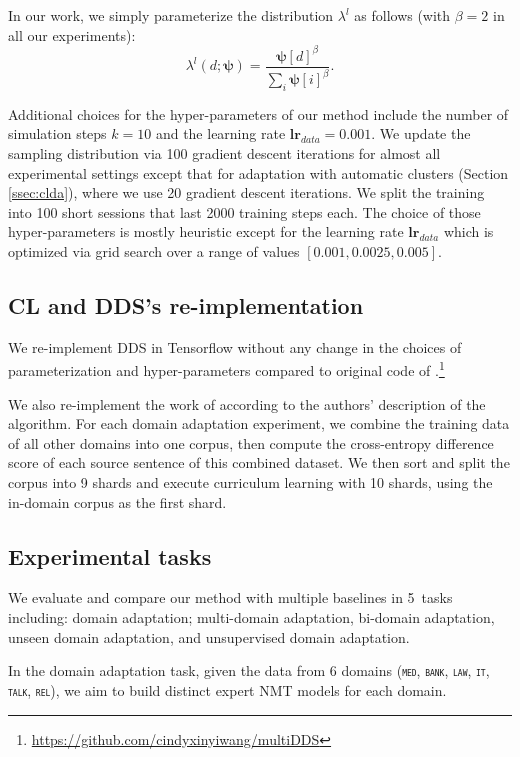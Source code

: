\documentclass[11pt]{article}
\newcommand{\fyTodo}[1]{\Todo[FY:]{\textcolor{orange}{#1}}}
\newcommand{\domain}[1]{\texttt{\textsc{#1}}}
\newcommand{\vpsi}{\ensuremath{\boldsymbol\psi}\xspace} %
\begin{document}
In our work, we simply parameterize the distribution $\lambda^l$ as follows (with $\beta=2$ in all our experiments):\fyTodo{Explain why}
\begin{equation}
\lambda
^l(d;\vpsi) = \frac{\vpsi[d]^\beta}{\sum_i \vpsi[i]^\beta}. \nonumber
\end{equation}

Additional choices for the hyper-parameters of our method include the number of simulation steps $k=10$ and the learning rate $\mathbf{lr}_{data}=0.001$. We update the sampling distribution via 100 gradient descent iterations for almost all experimental settings except that for adaptation with automatic clusters (Section \ref{ssec:clda}), where we use 20 gradient descent iterations.\fyTodo{Why? computation?} We split the training into 100 short sessions that last 2000 training steps each. The choice of those hyper-parameters is mostly heuristic except for the learning rate $\mathbf{lr}_{data}$ which is optimized via grid search over a range of values $[0.001,0.0025,0.005]$.

\subsection{CL and DDS's re-implementation}\fyTodo{Right place for this ?}
We re-implement DDS in Tensorflow without any change in the choices of parameterization and hyper-parameters compared to original code of \citet{Wang20balancing}.\footnote{\url{https://github.com/cindyxinyiwang/multiDDS}}

We also re-implement the work of \citet{Zhang19curriculum} according to the authors' description of the algorithm. For each domain adaptation experiment, we combine the training data of all other domains into one corpus, then compute the cross-entropy difference score of each source sentence of this combined dataset. We then sort and split the corpus into 9 shards and execute curriculum learning with 10 shards, using the in-domain corpus as the first shard.

\subsection{Experimental tasks}
We evaluate and compare our method with multiple baselines in 5~tasks including: domain adaptation; multi-domain adaptation, bi-domain adaptation, unseen domain adaptation, and unsupervised domain adaptation.

In the domain adaptation task, given the data from 6 domains (\domain{med}, \domain{bank}, \domain{law}, \domain{it}, \domain{talk}, \domain{rel}), we aim to build distinct expert NMT models for each domain.
\end{document}
